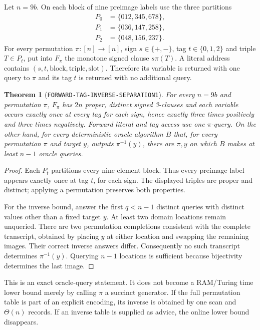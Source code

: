 \documentclass[11pt]{article}
\newtheorem{theorem}{Theorem}
\begin{document}
Let $n=9b$.  On each block of nine preimage labels use the three partitions
\[
\begin{split}
P_0&=\{012,345,678\},\\
P_1&=\{036,147,258\},\\
P_2&=\{048,156,237\}.
\end{split}
\]
For every permutation $\pi:[n]\to[n]$, sign $s\in\{+,-\}$, tag
$t\in\{0,1,2\}$ and triple $T\in P_t$, put into $F_\pi$ the monotone
signed clause $s\pi(T)$.  A literal address contains $(s,t,\text{block},
\text{triple},\text{slot})$.  Therefore its variable is returned with one
query to $\pi$ and its tag $t$ is returned with no additional query.

\begin{theorem}[\texttt{FORWARD-TAG-INVERSE-SEPARATION1}]
For every $n=9b$ and permutation $\pi$, $F_\pi$ has $2n$ proper, distinct
signed 3-clauses and each variable occurs exactly once at every tag for each
sign, hence exactly three times positively and three times negatively.
Forward literal and tag access use one $\pi$-query.  On the other hand, for
every deterministic oracle algorithm $B$ that, for every permutation $\pi$
and target $y$, outputs $\pi^{-1}(y)$, there are $\pi,y$ on which $B$ makes
at least $n-1$ oracle queries.
\end{theorem}

\begin{proof}
Each $P_t$ partitions every nine-element block.  Thus every preimage label
appears exactly once at tag $t$, for each sign.  The displayed triples are
proper and distinct; applying a permutation preserves both properties.

For the inverse bound, answer the first $q<n-1$ distinct queries with
distinct values other than a fixed target $y$.  At least two domain
locations remain unqueried.  There are two permutation completions consistent
with the complete transcript, obtained by placing $y$ at either location and
swapping the remaining images.  Their correct inverse answers differ.
Consequently no such transcript determines $\pi^{-1}(y)$.  Querying $n-1$
locations is sufficient because bijectivity determines the last image.
\end{proof}

This is an exact oracle-query statement.  It does not become a RAM/Turing
time lower bound merely by calling $\pi$ a succinct generator.  If the full
permutation table is part of an explicit encoding, its inverse is obtained by
one scan and $\Theta(n)$ records.  If an inverse table is supplied as advice,
the online lower bound disappears.
\end{document}
